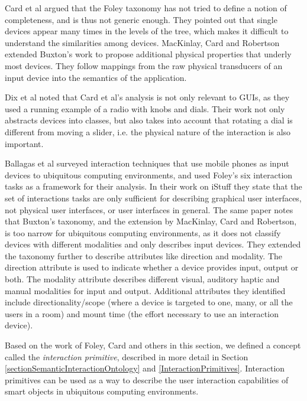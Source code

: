 	Card et al \cite{Card1991} argued that the Foley taxonomy has not tried to define a notion of completeness, and is thus not generic enough. They pointed out that single devices appear many times in the levels of the tree, which makes it difficult to understand the similarities among devices. MacKinlay, Card and Robertson \cite{MacKinlay1990} extended Buxton's work to propose additional physical properties that underly most devices. They follow mappings from the raw physical transducers of an input device into the semantics of the application.
	
	Dix et al \cite{Dix2008} noted that Card et al's analysis is not only relevant to GUIs, as they used a running example of a radio with knobs and dials. Their work not only abstracts devices into classes, but also takes into account that rotating a dial is different from moving a slider, i.e. the physical nature of the interaction is also important.
	
	 Ballagas et al \cite{Ballagas2006} surveyed interaction techniques that use mobile phones as input devices to ubiquitous computing environments, and used Foley's six interaction tasks as a framework for their analysis. In their work on iStuff \cite{Ballagas2003} they state that the set of interactions tasks are only sufficient for describing graphical user interfaces, not physical user interfaces, or user interfaces in general. The same paper notes that Buxton's taxonomy, and the extension by MacKinlay, Card and Robertson, is too narrow for ubiquitous computing environments, as it does not classify devices with different modalities and only describes input devices. They extended the taxonomy further to describe attributes like direction and modality. The direction attribute is used to indicate whether a device provides input, output or both. The modality attribute describes different visual, auditory haptic and manual modalities for input and output. Additional attributes they identified include directionality/scope (where a device is targeted to one, many, or all the users in a room) and mount time (the effort necessary to use an interaction device).

Based on the work of Foley, Card and others in this section, we defined a concept called the \emph{interaction primitive}, described in more detail in Section \ref{sectionSemanticInteractionOntology} and \ref{InteractionPrimitives}. Interaction primitives can be used as a way to describe the user interaction capabilities of smart objects in ubiquitous computing environments.
	
